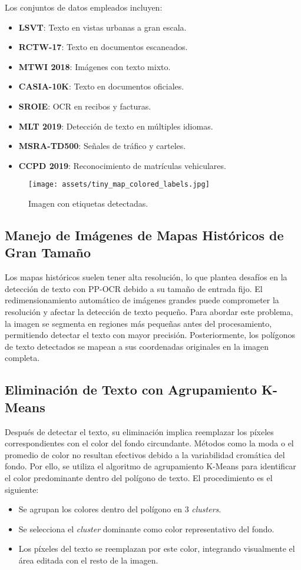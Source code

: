 \documentclass[twocolumn, fontsize=10pt]{article}
\begin{document}
Los conjuntos de datos empleados incluyen:
\begin{itemize}
    \item \textbf{LSVT}: Texto en vistas urbanas a gran escala.
    \item \textbf{RCTW-17}: Texto en documentos escaneados.
    \item \textbf{MTWI 2018}: Imágenes con texto mixto.
    \item \textbf{CASIA-10K}: Texto en documentos oficiales.
    \item \textbf{SROIE}: OCR en recibos y facturas.
    \item \textbf{MLT 2019}: Detección de texto en múltiples idiomas.
    \item \textbf{MSRA-TD500}: Señales de tráfico y carteles.
    \item \textbf{CCPD 2019}: Reconocimiento de matrículas vehiculares.
\end{itemize}

\begin{figure}[H]
    \centering
    \texttt{[image: assets/tiny\_map\_colored\_labels.jpg]}
    \caption{Imagen con etiquetas detectadas.}
    \label{fig:tiny_map_colored_labels}
\end{figure}

\subsection{Manejo de Imágenes de Mapas Históricos de Gran Tamaño}
Los mapas históricos suelen tener alta resolución, lo que plantea desafíos en la detección de texto con PP-OCR debido a su tamaño de entrada fijo. El redimensionamiento automático de imágenes grandes puede comprometer la resolución y afectar la detección de texto pequeño. Para abordar este problema, la imagen se segmenta en regiones más pequeñas antes del procesamiento, permitiendo detectar el texto con mayor precisión. Posteriormente, los polígonos de texto detectados se mapean a sus coordenadas originales en la imagen completa.

\subsection{Eliminación de Texto con Agrupamiento K-Means}
Después de detectar el texto, su eliminación implica reemplazar los píxeles correspondientes con el color del fondo circundante. Métodos como la moda o el promedio de color no resultan efectivos debido a la variabilidad cromática del fondo. Por ello, se utiliza el algoritmo de agrupamiento K-Means para identificar el color predominante dentro del polígono de texto. El procedimiento es el siguiente:
\begin{itemize}
    \item Se agrupan los colores dentro del polígono en 3 \textit{clusters}.
    \item Se selecciona el \textit{cluster} dominante como color representativo del fondo.
    \item Los píxeles del texto se reemplazan por este color, integrando visualmente el área editada con el resto de la imagen.
\end{itemize}
\end{document}
